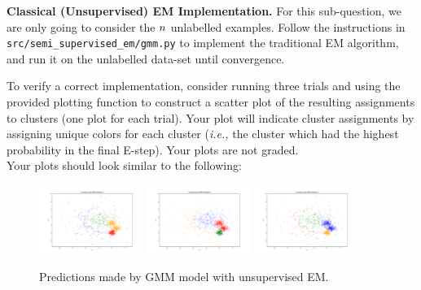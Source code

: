 \item{} \textbf{Classical (Unsupervised) EM Implementation.}
For this sub-question, we are only going to consider the ${n}$ unlabelled examples. Follow the instructions in \texttt{src/semi\_supervised\_em/gmm.py} to implement the traditional EM algorithm, and run it on the unlabelled data-set until convergence.

To verify a correct implementation, consider running three trials and using the provided plotting function to construct a scatter plot of the resulting assignments to clusters (one plot for each trial). Your plot will indicate cluster assignments by assigning unique colors for each cluster (\emph{i.e.,} the cluster which had the highest probability in the final E-step).  Your plots are not graded.\\

Your plots should look similar to the following:

  \begin{figure}[H]
    \centering
    \includegraphics[width=0.3\textwidth]{semi_supervised_em/pred_0.pdf}
    \includegraphics[width=0.3\textwidth]{semi_supervised_em/pred_1.pdf}
    \includegraphics[width=0.3\textwidth]{semi_supervised_em/pred_2.pdf}
    \caption{Predictions made by GMM model with unsupervised EM.}
  \end{figure}
